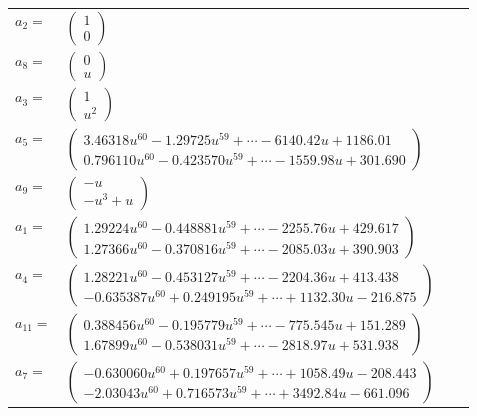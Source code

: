 \documentclass[1p]{elsarticle_modified}
\theoremstyle{definition}
\begin{document}
\begin{tabular}{m{7pt} m{180pt} m{7pt} m{180pt} }
\flushright $a_{2}=$&$\begin{pmatrix}1\\0\end{pmatrix}$ \\
\flushright $a_{8}=$&$\begin{pmatrix}0\\u\end{pmatrix}$ \\
\flushright $a_{3}=$&$\begin{pmatrix}1\\u^2\end{pmatrix}$ \\
\flushright $a_{5}=$&$\begin{pmatrix}3.46318 u^{60}-1.29725 u^{59}+\cdots-6140.42 u+1186.01\\0.796110 u^{60}-0.423570 u^{59}+\cdots-1559.98 u+301.690\end{pmatrix}$ \\
\flushright $a_{9}=$&$\begin{pmatrix}- u\\- u^3+u\end{pmatrix}$ \\
\flushright $a_{1}=$&$\begin{pmatrix}1.29224 u^{60}-0.448881 u^{59}+\cdots-2255.76 u+429.617\\1.27366 u^{60}-0.370816 u^{59}+\cdots-2085.03 u+390.903\end{pmatrix}$ \\
\flushright $a_{4}=$&$\begin{pmatrix}1.28221 u^{60}-0.453127 u^{59}+\cdots-2204.36 u+413.438\\-0.635387 u^{60}+0.249195 u^{59}+\cdots+1132.30 u-216.875\end{pmatrix}$ \\
\flushright $a_{11}=$&$\begin{pmatrix}0.388456 u^{60}-0.195779 u^{59}+\cdots-775.545 u+151.289\\1.67899 u^{60}-0.538031 u^{59}+\cdots-2818.97 u+531.938\end{pmatrix}$ \\
\flushright $a_{7}=$&$\begin{pmatrix}-0.630060 u^{60}+0.197657 u^{59}+\cdots+1058.49 u-208.443\\-2.03043 u^{60}+0.716573 u^{59}+\cdots+3492.84 u-661.096\end{pmatrix}$ \\

\end{tabular}
\end{document}
